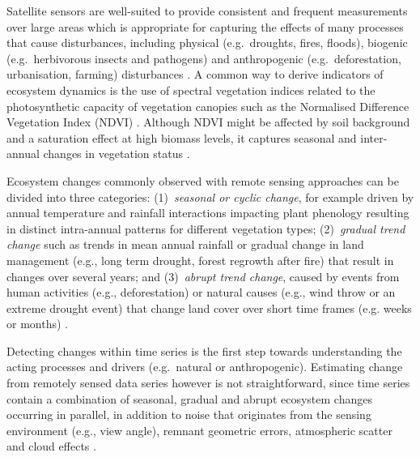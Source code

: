 \documentclass[authoryear,preprint,review,10pt]{elsarticle}
\begin{document}
Satellite sensors are well-suited to provide consistent and frequent measurements over large areas which is appropriate for capturing the effects of many processes that cause disturbances, including physical (e.g.\ droughts, fires, floods), biogenic (e.g.\ herbivorous insects and pathogens) and anthropogenic (e.g.\ deforestation, urbanisation, farming) disturbances \citep{Jin2005, Potter2003}. A common way to derive indicators of ecosystem dynamics is the use of spectral vegetation indices related to the photosynthetic capacity of vegetation canopies such as the Normalised Difference Vegetation Index (NDVI) \citep[][]{Myneni1995, Pettorelli:2005ed, Potter2003}.  Although NDVI might be affected by soil background and a saturation effect at high biomass levels, it captures seasonal and inter-annual changes in vegetation status \citep{Huete2002,Myneni:1997ur}. 

Ecosystem changes commonly observed with remote sensing approaches can be divided into three categories: 
(1)~\emph{seasonal or cyclic change}, for example driven by annual temperature and rainfall interactions impacting plant phenology resulting in distinct intra-annual patterns for different vegetation types; 
(2)~\emph{gradual trend change} such as trends in mean annual rainfall or gradual change in land management (e.g., long term drought, forest regrowth after fire) that result in changes over several years; and 
(3)~\emph{abrupt trend change}, caused by events from human activities (e.g., deforestation) or natural causes (e.g., wind throw or an extreme drought event) that change land cover over short time frames (e.g. weeks or months) 
\citep{Beurs2005a,Verbesselt2009a,Verbesselt:2010wo}. 

Detecting changes within time series is the first step towards understanding the acting processes and drivers (e.g.\ natural or anthropogenic). Estimating change from remotely sensed data series however is not straightforward, since time series contain a combination of seasonal, gradual and abrupt ecosystem changes occurring in parallel, in addition to noise that originates from the sensing environment (e.g., view angle), remnant geometric errors, atmospheric scatter and cloud effects \citep{Beurs2005a, Roy2002, Wolfe1998}. 
\end{document}
